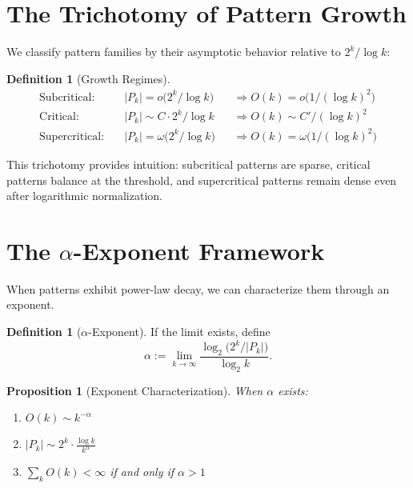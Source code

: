 \documentclass[11pt]{article}
\newtheorem{proposition}[theorem]{Proposition}
\theoremstyle{definition}
\newtheorem{definition}[theorem]{Definition}
\begin{document}
\section{The Trichotomy of Pattern Growth}

We classify pattern families by their asymptotic behavior relative to $2^k/\log k$:

\begin{definition}[Growth Regimes]
\begin{align*}
\text{Subcritical:}&\quad |P_k|=o\big(2^k/\log k\big) &&\Rightarrow O(k)=o\big(1/(\log k)^2\big)\\
\text{Critical:}&\quad |P_k|\sim C\cdot 2^k/\log k &&\Rightarrow O(k)\sim C'/(\log k)^2\\
\text{Supercritical:}&\quad |P_k|=\omega\big(2^k/\log k\big) &&\Rightarrow O(k)=\omega\big(1/(\log k)^2\big)
\end{align*}
\end{definition}

This trichotomy provides intuition: subcritical patterns are sparse, critical patterns balance at the threshold, and supercritical patterns remain dense even after logarithmic normalization.

\section{The $\alpha$-Exponent Framework}

When patterns exhibit power-law decay, we can characterize them through an exponent.

\begin{definition}[$\alpha$-Exponent]
If the limit exists, define
\begin{equation}\label{eq:alpha}
\alpha:=\lim_{k\to\infty}\frac{\log_2\big(2^k/|P_k|\big)}{\log_2 k}.
\end{equation}
\end{definition}

\begin{proposition}[Exponent Characterization]
When $\alpha$ exists:
\begin{enumerate}
\item $O(k)\sim k^{-\alpha}$
\item $|P_k|\sim 2^k\cdot\frac{\log k}{k^{\alpha}}$
\item $\sum_k O(k)<\infty$ if and only if $\alpha>1$
\end{enumerate}
\end{proposition}
\end{document}

